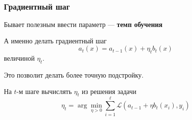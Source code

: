 \documentclass{beamer}
\begin{document}
	\begin{frame}
		\frametitle{Градиентный шаг}

		Бывает полезным ввести параметр --- \textbf{темп обучения}

		А именно делать градиентный шаг
		\[
		a_t(x) = a_{t-1}(x) + \eta_t b_t(x)
		\]
		величиной $\eta_t$.

		Это позволит делать более точную подстройку.

		\vspace{15pt}

		На $t$-м шаге вычислять $\eta_t$ из решения задачи
		\[
		\eta_t = \arg \min_{\eta > 0} \sum_{i=1}^{\ell} \mathcal{L} (a_{t-1} + \eta b_t(x_i), y_i)
		\]
	\end{frame}
\end{document}
